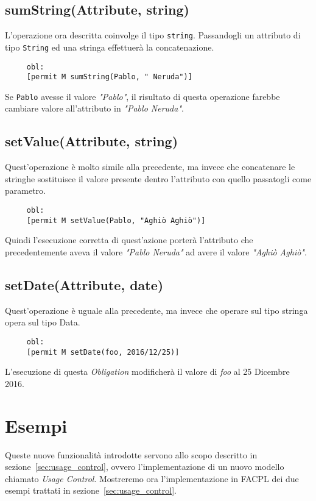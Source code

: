\subsection*{sumString(Attribute, string)}
\label{ssub:opsumstring}

L'operazione ora descritta coinvolge il tipo \texttt{string}. Passandogli un attributo
di tipo \texttt{String} ed una stringa effettuerà la concatenazione.
\begin{verbatim}
	 obl:
     [permit M sumString(Pablo, " Neruda")]
\end{verbatim}
Se \texttt{Pablo} avesse il valore \textit{"Pablo"}, il risultato di questa operazione farebbe cambiare valore all'attributo in \textit{"Pablo Neruda"}.

\subsection*{setValue(Attribute, string)}
\label{ssub:opsetvalue}

Quest'operazione è molto simile alla precedente, ma invece che concatenare le stringhe sostituisce il valore presente dentro l'attributo con quello passatogli come parametro.
\begin{verbatim}
	 obl:
     [permit M setValue(Pablo, "Aghiò Aghiò")]
\end{verbatim}
Quindi l'esecuzione corretta di quest'azione porterà l'attributo che precedentemente aveva il valore 
\textit{"Pablo Neruda"} ad avere il valore \textit{"Aghiò Aghiò"}.


\subsection*{setDate(Attribute, date)}
\label{ssub:opsetvalue}

Quest'operazione è uguale alla precedente, ma invece che operare sul tipo stringa opera sul tipo Data.
\begin{verbatim}
	 obl:
     [permit M setDate(foo, 2016/12/25)]
\end{verbatim}
L'esecuzione di questa \textit{Obligation} modificherà il valore di \textit{foo} al 25 Dicembre 2016.


\section{Esempi} %
\label{sec:esempi}

Queste nuove funzionalità introdotte servono allo scopo descritto in sezione~\ref{sec:usage_control}, ovvero l'implementazione di un nuovo modello chiamato \textit{Usage Control}.
Mostreremo ora l'implementazione in FACPL dei due esempi trattati in sezione~\ref{sec:usage_control}. 
